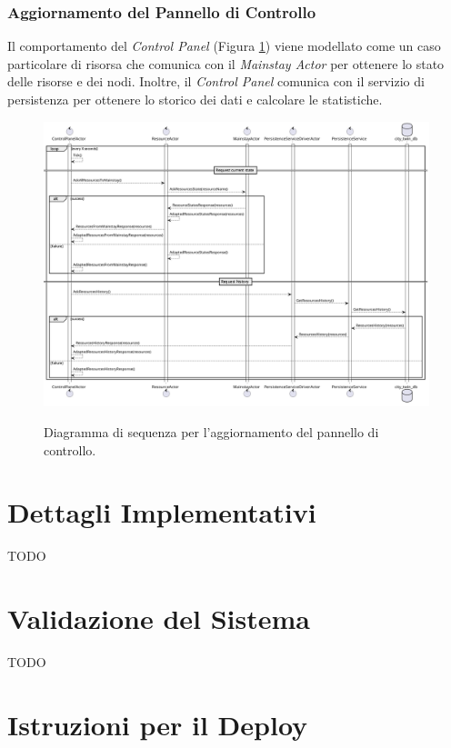 \documentclass{scrartcl}
\begin{document}
\subsubsection{Aggiornamento del Pannello di Controllo}

Il comportamento del \textit{Control Panel} (Figura \ref{fig:control-panel-sequence-diagram}) viene modellato come un caso particolare di risorsa che comunica con il \textit{Mainstay Actor} per ottenere lo stato delle risorse e dei nodi. Inoltre, il \textit{Control Panel} comunica con il servizio di persistenza per ottenere lo storico dei dati e calcolare le statistiche.

\begin{figure}[H]
    \caption{Diagramma di sequenza per l'aggiornamento del pannello di controllo.}
    \includegraphics[width=\textwidth]{../assets/images/control-panel-sequence-diagram.png}
    \label{fig:control-panel-sequence-diagram}
\end{figure}

\section{Dettagli Implementativi}
TODO

\section{Validazione del Sistema}
TODO

\section{Istruzioni per il Deploy}
\end{document}
